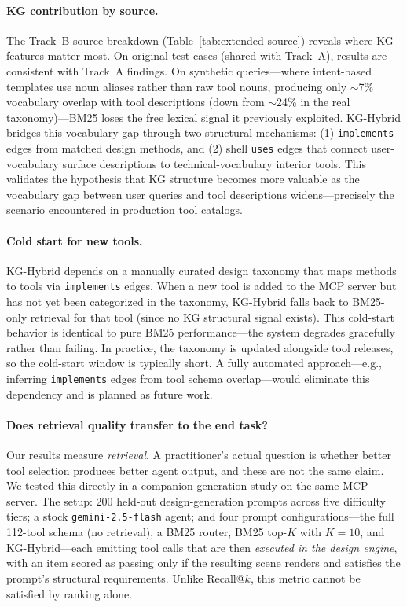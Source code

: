 \documentclass[11pt,a4paper]{article}
\begin{document}
\paragraph{KG contribution by source.}
The Track~B source breakdown (Table~\ref{tab:extended-source}) reveals where KG features matter most. On original test cases (shared with Track~A), results are consistent with Track~A findings. On synthetic queries---where intent-based templates use noun aliases rather than raw tool nouns, producing only $\sim$7\% vocabulary overlap with tool descriptions (down from $\sim$24\% in the real taxonomy)---BM25 loses the free lexical signal it previously exploited. KG-Hybrid bridges this vocabulary gap through two structural mechanisms: (1) \texttt{implements} edges from matched design methods, and (2) shell \texttt{uses} edges that connect user-vocabulary surface descriptions to technical-vocabulary interior tools. This validates the hypothesis that KG structure becomes more valuable as the vocabulary gap between user queries and tool descriptions widens---precisely the scenario encountered in production tool catalogs.

\paragraph{Cold start for new tools.}
KG-Hybrid depends on a manually curated design taxonomy that maps methods to tools via \texttt{implements} edges. When a new tool is added to the MCP server but has not yet been categorized in the taxonomy, KG-Hybrid falls back to BM25-only retrieval for that tool (since no KG structural signal exists). This cold-start behavior is identical to pure BM25 performance---the system degrades gracefully rather than failing. In practice, the taxonomy is updated alongside tool releases, so the cold-start window is typically short. A fully automated approach---e.g., inferring \texttt{implements} edges from tool schema overlap---would eliminate this dependency and is planned as future work.

\paragraph{Does retrieval quality transfer to the end task?}
Our results measure \emph{retrieval}. A practitioner's actual question is whether better tool
selection produces better agent output, and these are not the same claim. We tested this directly in
a companion generation study on the same MCP server. The setup: 200 held-out design-generation
prompts across five difficulty tiers; a stock \texttt{gemini-2.5-flash} agent; and four prompt
configurations---the full 112-tool schema (no retrieval), a BM25 router, BM25 top-$K$ with $K=10$,
and KG-Hybrid---each emitting tool calls that are then \emph{executed in the design engine}, with an
item scored as passing only if the resulting scene renders and satisfies the prompt's structural
requirements. Unlike Recall@$k$, this metric cannot be satisfied by ranking alone.
\end{document}
